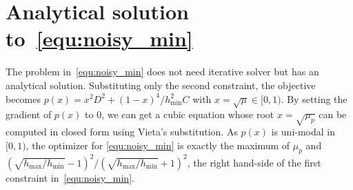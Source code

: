 \section{Analytical solution to~\eqref{equ:noisy_min}}
\label{sec:opt}
The problem in~\eqref{equ:noisy_min} does not need iterative solver but has an analytical solution. Substituting only the second constraint, the objective becomes $p(x)=x^2D^2 + (1-x)^4/h_{\min}^2C$ with $x=\sqrt{\mu} \in [0, 1)$. By setting the gradient of $p(x)$ to 0, we can get a cubic equation whose root $x=\sqrt{\mu_p}$ can be computed in closed form using Vieta's substitution. As $p(x)$ is uni-modal in $[0, 1)$, the optimizer for \eqref{equ:noisy_min} is exactly the maximum of $\mu_p$ and $(\sqrt{h_{\max}/h_{\min} }-1 )^2 / (\sqrt{h_{\max}/h_{\min}}+1)^2$, the right hand-side of the first constraint in~\eqref{equ:noisy_min}.
